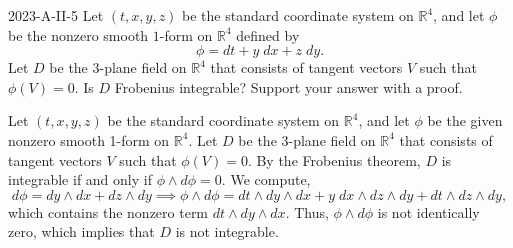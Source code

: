 \documentclass{article}
\begin{document}
	\begin{prb}{2023-A-II-5}
		Let $(t, x, y, z)$ be the standard coordinate system on $\mathbb{R}^{4}$, and let $\phi$ be the nonzero smooth $1$-form on $\mathbb{R}^{4}$ defined by 
		\begin{equation*}
			\phi = dt + y\;dx + z\;dy. 
		\end{equation*}
		Let $D$ be the 3-plane field on $\mathbb{R}^{4}$ that consists of tangent vectors $V$ such that $\phi(V) = 0$. Is $D$ Frobenius integrable? Support your answer with a proof. 
	\end{prb}
	Let $(t, x, y, z)$ be the standard coordinate system on $\mathbb{R}^{4}$, and let $\phi$ be the given nonzero smooth 1-form on $\mathbb{R}^{4}$. Let $D$ be the 3-plane field on $\mathbb{R}^{4}$ that consists of tangent vectors $V$ such that $\phi(V) = 0$. By the Frobenius theorem, $D$ is integrable if and only if $\phi \wedge d\phi = 0$. We compute, 
	\begin{equation*}
		d\phi = dy \wedge dx + dz \wedge dy \implies \phi \wedge d\phi = dt \wedge dy \wedge dx + y\;dx \wedge dz \wedge dy + dt \wedge dz \wedge dy,     
	\end{equation*}
	which contains the nonzero term $dt \wedge dy \wedge dx$. Thus, $\phi \wedge d\phi$ is not identically zero, which implies that $D$ is not integrable. 
	
\end{document}
